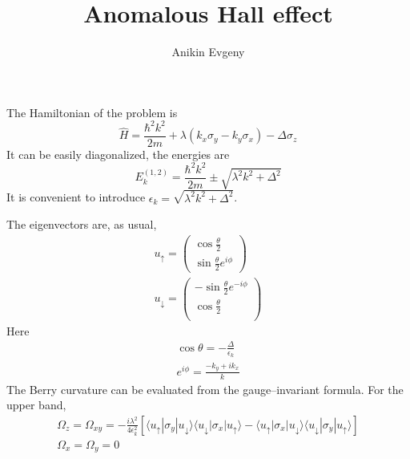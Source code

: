 \documentclass{article}
\title{Anomalous Hall effect}
\author{Anikin Evgeny}
\begin{document}
\maketitle
The Hamiltonian of the problem is
\begin{equation}
    \hat{H} = \frac{\hbar^2 k^2}{2m} + 
            \lambda (k_x \sigma_y - k_y \sigma_x) - \Delta \sigma_z
\end{equation}
It can be easily diagonalized, the energies are
\begin{equation}
    E_k^{(1,2)} = \frac{\hbar^2 k^2}{2m} \pm \sqrt{\lambda^2 k^2 + \Delta^2}
\end{equation}
It is convenient to introduce $\epsilon_k = \sqrt{\lambda^2 k^2 + \Delta^2}$.

The eigenvectors are, as usual,
\begin{equation}
    \begin{gathered}
        u_\uparrow = \begin{pmatrix}
                        \cos{\frac{\theta}{2}} \\
                        \sin{\frac{\theta}{2}e^{i\phi}}
                    \end{pmatrix}\\
        u_\downarrow = \begin{pmatrix}
                        -\sin{\frac{\theta}{2}e^{-i\phi}}\\
                        \cos{\frac{\theta}{2}} \\
                    \end{pmatrix}
    \end{gathered}
\end{equation}
Here
\begin{equation}
    \begin{gathered}
        \cos{\theta} = -\frac{\Delta}{\epsilon_k}\\
        e^{i\phi} = \frac{-k_y + ik_x}{k}
    \end{gathered}
\end{equation}
The Berry curvature can be evaluated from the gauge--invariant formula. For the upper band,
\begin{equation}
    \begin{gathered}
        \Omega_z = \Omega_{xy} = -\frac{i\lambda^2}{4\epsilon_k^2}
                   \left[         \langle u_\uparrow | \sigma_y | u_\downarrow \rangle 
                                  \langle u_\downarrow|\sigma_x |u_\uparrow\rangle - 
                                  \langle u_\uparrow | \sigma_x | u_\downarrow \rangle 
                                  \langle u_\downarrow|\sigma_y |u_\uparrow\rangle \right]\\
        \Omega_x = \Omega_y = 0
    \end{gathered}
\end{equation}
\end{document}
